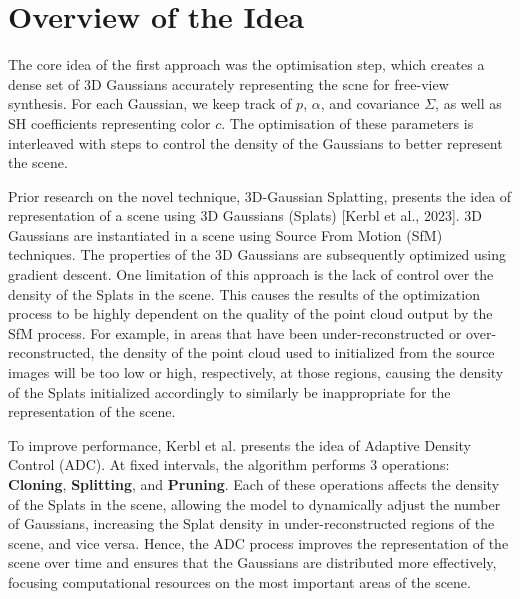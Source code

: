 \documentclass[11pt]{report}
\begin{document}
\section{Overview of the Idea}

The core idea of the first approach was the optimisation step, which creates a dense set of 3D Gaussians accurately representing the scne for free-view synthesis. For each Gaussian, we keep track of $p$, $\alpha$, and covariance $\Sigma$, as well as SH coefficients representing color $c$. The optimisation of these parameters is interleaved with steps to control the density of the Gaussians to better represent the scene.

Prior research on the novel technique, 3D-Gaussian Splatting, presents the idea of representation of a scene using 3D Gaussians (Splats) [Kerbl et al., 2023]. 3D Gaussians are instantiated in a scene using Source From Motion (SfM) techniques. The properties of the 3D Gaussians are subsequently optimized using gradient descent. One limitation of this approach is the lack of control over the density of the Splats in the scene. This causes the results of the optimization process to be highly dependent on the quality of the point cloud output by the SfM process. For example, in areas that have been under-reconstructed or over-reconstructed, the density of the point cloud used to initialized from the source images will be too low or high, respectively, at those regions, causing the density of the Splats initialized accordingly to similarly be inappropriate for the representation of the scene.

To improve performance, Kerbl et al. presents the idea of Adaptive Density Control (ADC). At fixed intervals, the algorithm performs 3 operations: \textbf{Cloning}, \textbf{Splitting}, and \textbf{Pruning}. Each of these operations affects the density of the Splats in the scene, allowing the model to dynamically adjust the number of Gaussians, increasing the Splat density in under-reconstructed regions of the scene, and vice versa. Hence, the ADC process improves the representation of the scene over time and ensures that the Gaussians are distributed more effectively, focusing computational resources on the most important areas of the scene.


\end{document}
